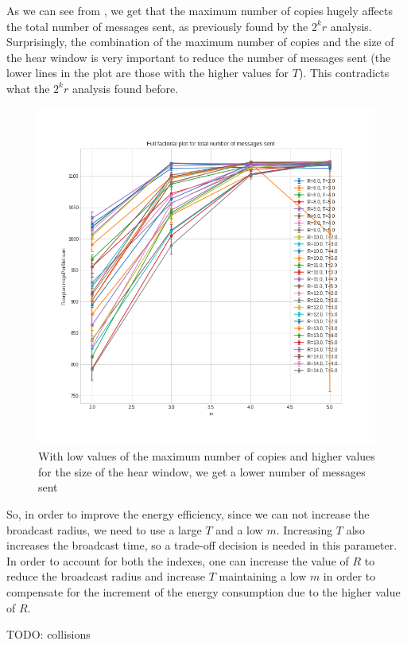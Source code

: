 As we can see from , we get that the maximum number of
copies hugely affects the total number of messages sent, as previously found by
the \(2^{k}r\) analysis. Surprisingly, the combination of the maximum number of
copies and the size of the hear window is very important to reduce the number of
messages sent (the lower lines in the plot are those with the higher values for
\(T\)). This contradicts what the \(2^{k}r\) analysis found before.

\begin{figure}
	\centering
	\includegraphics[width=\textwidth]{img/hd/messages-m-ffplot}
	\caption{With low values of the maximum number of copies and higher
	values for the size of the hear window, we get a lower number of
	messages sent}\label{fig:hdmessagesff}
\end{figure}

So, in order to improve the energy efficiency, since we can not increase the
broadcast radius, we need to use a large \(T\) and a low \(m\). Increasing
\(T\) also increases the broadcast time, so a trade-off decision is needed in
this parameter. In order to account for both the indexes, one can increase the
value of \(R\) to reduce the broadcast radius and increase \(T\) maintaining a
low \(m\) in order to compensate for the increment of the energy consumption due
to the higher value of \(R\).

TODO\@: collisions
